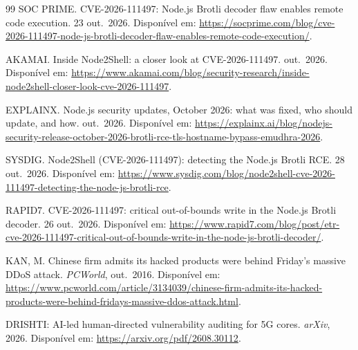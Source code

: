 \documentclass[12pt,a4paper]{article}
\begin{document}
\begin{thebibliography}{99}
SOC PRIME. CVE-2026-111497: Node.js Brotli decoder flaw enables remote code
execution. 23 out.\ 2026. Disponível em:
\url{https://socprime.com/blog/cve-2026-111497-node-js-brotli-decoder-flaw-enables-remote-code-execution/}.

AKAMAI. Inside Node2Shell: a closer look at CVE-2026-111497. out.\ 2026.
Disponível em:
\url{https://www.akamai.com/blog/security-research/inside-node2shell-closer-look-cve-2026-111497}.

EXPLAINX. Node.js security updates, October 2026: what was fixed, who should
update, and how. out.\ 2026. Disponível em:
\url{https://explainx.ai/blog/nodejs-security-release-october-2026-brotli-rce-tls-hostname-bypass-emudhra-2026}.

SYSDIG. Node2Shell (CVE-2026-111497): detecting the Node.js Brotli RCE.
28 out.\ 2026. Disponível em:
\url{https://www.sysdig.com/blog/node2shell-cve-2026-111497-detecting-the-node-js-brotli-rce}.

RAPID7. CVE-2026-111497: critical out-of-bounds write in the Node.js Brotli
decoder. 26 out.\ 2026. Disponível em:
\url{https://www.rapid7.com/blog/post/etr-cve-2026-111497-critical-out-of-bounds-write-in-the-node-js-brotli-decoder/}.

KAN, M. Chinese firm admits its hacked products were behind Friday's massive
DDoS attack. \emph{PCWorld}, out.\ 2016. Disponível em:
\url{https://www.pcworld.com/article/3134039/chinese-firm-admits-its-hacked-products-were-behind-fridays-massive-ddos-attack.html}.

DRISHTI: AI-led human-directed vulnerability auditing for 5G cores.
\emph{arXiv}, 2026. Disponível em:
\url{https://arxiv.org/pdf/2608.30112}.

\end{thebibliography}
\end{document}
